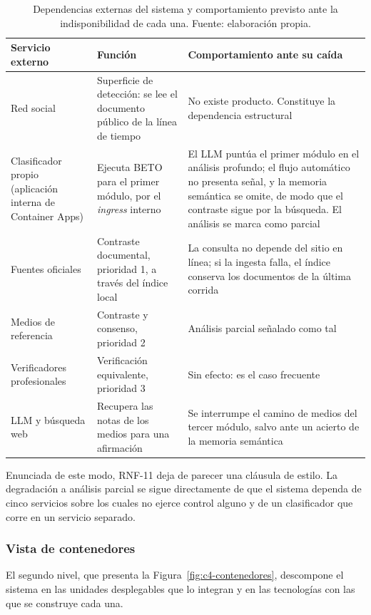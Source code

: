 \begin{table}[t]
  \centering
  \small
  \caption{Dependencias externas del sistema y comportamiento previsto ante la indisponibilidad de cada una. Fuente: elaboración propia.}
  \label{tab:dependencias}
  \begin{tabular}{p{3.4cm} p{4.6cm} p{5.2cm}}
    \hline
    \textbf{Servicio externo} & \textbf{Función} & \textbf{Comportamiento ante su caída} \\
    \hline
    Red social & Superficie de detección: se lee el documento público de la línea de tiempo & No existe producto. Constituye la dependencia estructural \\
    Clasificador propio (aplicación interna de Container Apps) & Ejecuta BETO para el primer módulo, por el \textit{ingress} interno & El LLM puntúa el primer módulo en el análisis profundo; el flujo automático no presenta señal, y la memoria semántica se omite, de modo que el contraste sigue por la búsqueda. El análisis se marca como parcial \\
    Fuentes oficiales & Contraste documental, prioridad 1, a través del índice local & La consulta no depende del sitio en línea; si la ingesta falla, el índice conserva los documentos de la última corrida \\
    Medios de referencia & Contraste y consenso, prioridad 2 & Análisis parcial señalado como tal \\
    Verificadores profesionales & Verificación equivalente, prioridad 3 & Sin efecto: es el caso frecuente \\
    LLM y búsqueda web & Recupera las notas de los medios para una afirmación & Se interrumpe el camino de medios del tercer módulo, salvo ante un acierto de la memoria semántica \\
    \hline
  \end{tabular}
\end{table}

Enunciada de este modo, RNF-11 deja de parecer una cláusula de estilo. La degradación a análisis parcial se sigue directamente de que el sistema dependa de cinco servicios sobre los cuales no ejerce control alguno y de un clasificador que corre en un servicio separado.

\subsubsection{Vista de contenedores}

El segundo nivel, que presenta la Figura~\ref{fig:c4-contenedores}, descompone el sistema en las unidades desplegables que lo integran y en las tecnologías con las que se construye cada una.

